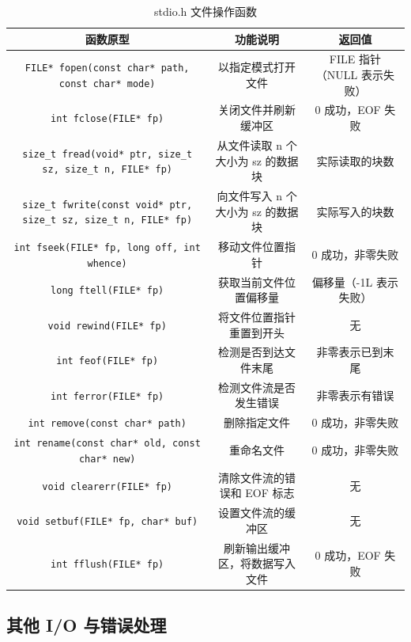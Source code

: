 \begin{table}[H]
\centering
\small
\renewcommand{\arraystretch}{1.5}
\begin{tabulary}{\linewidth}{CCC}
\toprule
\textbf{函数原型} & \textbf{功能说明} & \textbf{返回值} \\ \midrule
\texttt{FILE* fopen(const char* path, const char* mode)} & 以指定模式打开文件 & FILE 指针（NULL 表示失败） \\ 
\texttt{int fclose(FILE* fp)} & 关闭文件并刷新缓冲区 & 0 成功，EOF 失败 \\ 
\texttt{size\_t fread(void* ptr, size\_t sz, size\_t n, FILE* fp)} & 从文件读取 n 个大小为 sz 的数据块 & 实际读取的块数 \\ 
\texttt{size\_t fwrite(const void* ptr, size\_t sz, size\_t n, FILE* fp)} & 向文件写入 n 个大小为 sz 的数据块 & 实际写入的块数 \\ 
\texttt{int fseek(FILE* fp, long off, int whence)} & 移动文件位置指针 & 0 成功，非零失败 \\ 
\texttt{long ftell(FILE* fp)} & 获取当前文件位置偏移量 & 偏移量（-1L 表示失败） \\ 
\texttt{void rewind(FILE* fp)} & 将文件位置指针重置到开头 & 无 \\ 
\texttt{int feof(FILE* fp)} & 检测是否到达文件末尾 & 非零表示已到末尾 \\ 
\texttt{int ferror(FILE* fp)} & 检测文件流是否发生错误 & 非零表示有错误 \\ 
\texttt{int remove(const char* path)} & 删除指定文件 & 0 成功，非零失败 \\ 
\texttt{int rename(const char* old, const char* new)} & 重命名文件 & 0 成功，非零失败 \\ 
\texttt{void clearerr(FILE* fp)} & 清除文件流的错误和 EOF 标志 & 无 \\ 
\texttt{void setbuf(FILE* fp, char* buf)} & 设置文件流的缓冲区 & 无 \\ 
\texttt{int fflush(FILE* fp)} & 刷新输出缓冲区，将数据写入文件 & 0 成功，EOF 失败 \\ \bottomrule
\end{tabulary}
\caption{stdio.h 文件操作函数}
\label{tab:stdio_file}
\end{table}

\subsection{其他 I/O 与错误处理}

